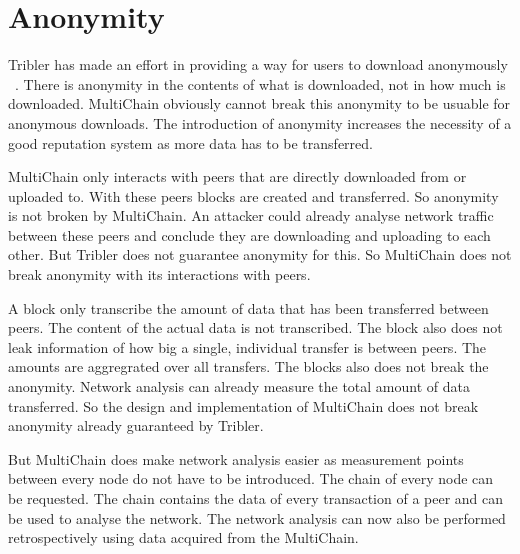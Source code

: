 \section{Anonymity}
Tribler has made an effort in providing a way for users to download anonymously
~\cite{Plak-anonymous,ruigrok-anonymous,tanaskoski-anonymous}.
There is anonymity in the contents of what is downloaded, not in how much is downloaded.
MultiChain obviously cannot break this anonymity to be usuable for anonymous downloads.
The introduction of anonymity increases the necessity of a good reputation system as more data has to be transferred.

MultiChain only interacts with peers that are directly downloaded from or uploaded to.
With these peers blocks are created and transferred.
So anonymity is not broken by MultiChain.
An attacker could already analyse network traffic between these peers
and conclude they are downloading and uploading to each other.
But Tribler does not guarantee anonymity for this.
So MultiChain does not break anonymity with its interactions with peers.

A block only transcribe the amount of data that has been transferred between peers.
The content of the actual data is not transcribed.
The block also does not leak information of how big a single, individual transfer is between peers.
The amounts are aggregrated over all transfers.
The blocks also does not break the anonymity.
Network analysis can already measure the total amount of data transferred.
So the design and implementation of MultiChain does not break anonymity already guaranteed by Tribler.

But MultiChain does make network analysis easier as measurement points between every node do not have to be introduced.
The chain of every node can be requested.
The chain contains the data of every transaction of a peer and can be used to analyse the network.
The network analysis can now also be performed retrospectively using data acquired from the MultiChain.
